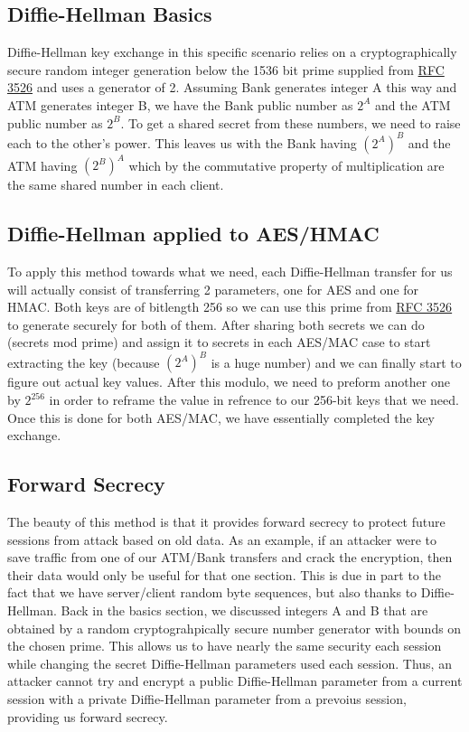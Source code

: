 			\subsection{Diffie-Hellman Basics}\label{sec:dhexbasic}
			Diffie-Hellman key exchange in this specific scenario relies on a cryptographically secure random integer generation below the 1536 bit prime supplied from \href{https://www.ietf.org/rfc/rfc3526.txt}{RFC 3526} and uses a generator of 2. Assuming Bank generates integer A this way and ATM generates integer B, we have the Bank public number as $2^A$ and the ATM public number as $2^B$. To get a shared secret from these numbers, we need to raise each to the other's power. This leaves us with the Bank having $(2^A)^B$ and the ATM having $(2^B)^A$ which by the commutative property of multiplication are the same shared number in each client.
			
			\subsection{Diffie-Hellman applied to AES/HMAC}\label{sec:dhexahm}
			To apply this method towards what we need, each Diffie-Hellman transfer for us will actually consist of transferring 2 parameters, one for AES and one for HMAC. Both keys are of bitlength 256 so we can use this prime from \href{https://www.ietf.org/rfc/rfc3526.txt}{RFC 3526} to generate securely for both of them. After sharing both secrets we can do (secrets mod prime) and assign it to secrets in each AES/MAC case to start extracting the key (because $(2^A)^B$ is a huge number) and we can finally start to figure out actual key values. After this modulo, we need to preform another one by $2^256$ in order to reframe the value in refrence to our 256-bit keys that we need. Once this is done for both AES/MAC, we have essentially completed the key exchange.
				
			\subsection{Forward Secrecy}\label{sec:dhexfwd}
				The beauty of this method is that it provides forward secrecy to protect future sessions from attack based on old data. As an example, if an attacker were to save traffic from one of our ATM/Bank transfers and crack the encryption, then their data would only be useful for that one section. This is due in part to the fact that we have server/client random byte sequences, but also thanks to Diffie-Hellman. Back in the basics section, we discussed integers A and B that are obtained by a random cryptograhpically secure number generator with bounds on the chosen prime. This allows us to have nearly the same security each session while changing the secret Diffie-Hellman parameters used each session. Thus, an attacker cannot try and encrypt a public Diffie-Hellman parameter from a current session with a private Diffie-Hellman parameter from a prevoius session, providing us forward secrecy.
		
